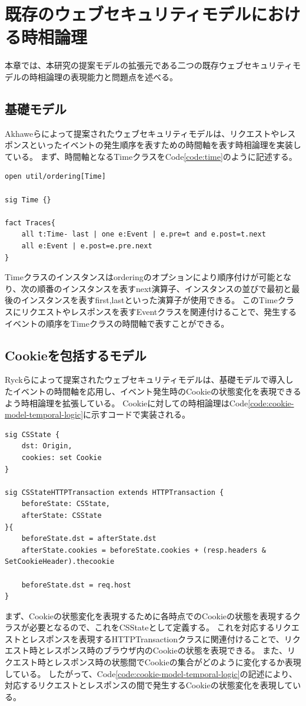 \documentclass[journal]{IEEEtran}
\begin{document}
\section{既存のウェブセキュリティモデルにおける時相論理}
本章では、本研究の提案モデルの拡張元である二つの既存ウェブセキュリティモデルの時相論理の表現能力と問題点を述べる。

\subsection{基礎モデル}
\label{sec:based-model}
Akhaweらによって提案されたウェブセキュリティモデル\cite{based-model}は、リクエストやレスポンスといったイベントの発生順序を表すための時間軸を表す時相論理を実装している。
まず、時間軸となるTimeクラスをCode\ref{code:time}のように記述する。
\begin{lstlisting}[caption=基礎モデルにおける時間軸, label=code:time]
open util/ordering[Time]

sig Time {}

fact Traces{
	all t:Time- last | one e:Event | e.pre=t and e.post=t.next
	all e:Event | e.post=e.pre.next
}
\end{lstlisting}
Timeクラスのインスタンスはorderingのオプションにより順序付けが可能となり、次の順番のインスタンスを表すnext演算子、インスタンスの並びで最初と最後のインスタンスを表すfirst,lastといった演算子が使用できる。
このTimeクラスにリクエストやレスポンスを表すEventクラスを関連付けることで、発生するイベントの順序をTimeクラスの時間軸で表すことができる。

\subsection{Cookieを包括するモデル}
\label{sec:cookie-model}
Ryckらによって提案されたウェブセキュリティモデル\cite{cookie-model}は、基礎モデルで導入したイベントの時間軸を応用し、イベント発生時のCookieの状態変化を表現できるよう時相論理を拡張している。
Cookieに対しての時相論理はCode\ref{code:cookie-model-temporal-logic}に示すコードで実装される。
\begin{lstlisting}[caption=Cookieに対する時相論理, label=code:cookie-model-temporal-logic]
sig CSState {
	dst: Origin,
	cookies: set Cookie
}

sig CSStateHTTPTransaction extends HTTPTransaction {
	beforeState: CSState,
	afterState: CSState
}{
	beforeState.dst = afterState.dst
	afterState.cookies = beforeState.cookies + (resp.headers & SetCookieHeader).thecookie
	
	beforeState.dst = req.host
}
\end{lstlisting}
まず、Cookieの状態変化を表現するために各時点でのCookieの状態を表現するクラスが必要となるので、これをCSStateとして定義する。
これを対応するリクエストとレスポンスを表現するHTTPTransactionクラスに関連付けることで、リクエスト時とレスポンス時のブラウザ内のCookieの状態を表現できる。
また、リクエスト時とレスポンス時の状態間でCookieの集合がどのように変化するか表現している。
したがって、Code\ref{code:cookie-model-temporal-logic}の記述により、対応するリクエストとレスポンスの間で発生するCookieの状態変化を表現している。
\end{document}
